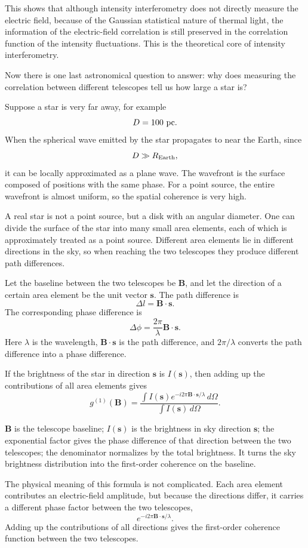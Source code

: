 This shows that although intensity interferometry does not directly measure the electric field, because of the Gaussian statistical nature of thermal light, the information of the electric-field correlation is still preserved in the correlation function of the intensity fluctuations. This is the theoretical core of intensity interferometry.

Now there is one last astronomical question to answer: why does measuring the correlation between different telescopes tell us how large a star is?

Suppose a star is very far away, for example
\[
  D=100\ {\rm pc}.
\]
When the spherical wave emitted by the star propagates to near the Earth, since
\[
  D\gg R_{\rm Earth},
\]
it can be locally approximated as a plane wave. The wavefront is the surface composed of positions with the same phase. For a point source, the entire wavefront is almost uniform, so the spatial coherence is very high.

A real star is not a point source, but a disk with an angular diameter. One can divide the surface of the star into many small area elements, each of which is approximately treated as a point source. Different area elements lie in different directions in the sky, so when reaching the two telescopes they produce different path differences.

Let the baseline between the two telescopes be \(\mathbf B\), and let the direction of a certain area element be the unit vector \(\mathbf s\). The path difference is
\[
  \Delta l=\mathbf B\cdot \mathbf s.
\]
The corresponding phase difference is
\[
  \Delta\phi
  =
  \frac{2\pi}{\lambda}\mathbf B\cdot\mathbf s.
\]
Here \(\lambda\) is the wavelength, \(\mathbf B\cdot\mathbf s\) is the path difference, and \(2\pi/\lambda\) converts the path difference into a phase difference.

If the brightness of the star in direction \(\mathbf s\) is \(I(\mathbf s)\), then adding up the contributions of all area elements gives
\[
  g^{(1)}(\mathbf B)
  =
  \frac{
    \int
    I(\mathbf s)
    e^{-i2\pi\mathbf B\cdot\mathbf s/\lambda}
    \,d\Omega
  }{
    \int
    I(\mathbf s)\,d\Omega
  }.
\]
\begin{formulaexplain}
\(\mathbf B\) is the telescope baseline; \(I(\mathbf s)\) is the brightness in sky direction \(\mathbf s\); the exponential factor gives the phase difference of that direction between the two telescopes; the denominator normalizes by the total brightness. It turns the sky brightness distribution into the first-order coherence on the baseline.
\end{formulaexplain}
The physical meaning of this formula is not complicated. Each area element contributes an electric-field amplitude, but because the directions differ, it carries a different phase factor between the two telescopes,
\[
  e^{-i2\pi\mathbf B\cdot\mathbf s/\lambda}.
\]
Adding up the contributions of all directions gives the first-order coherence function between the two telescopes.

